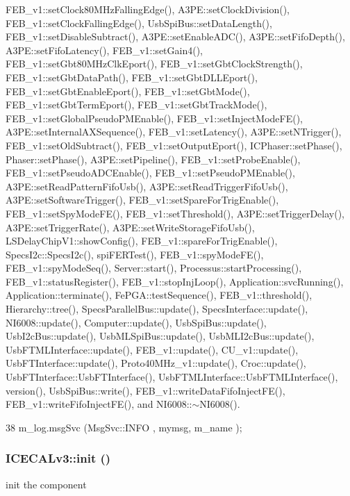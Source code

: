 FEB\_\-v1::setClock80MHzFallingEdge(), A3PE::setClockDivision(), FEB\_\-v1::setClockFallingEdge(), UsbSpiBus::setDataLength(), FEB\_\-v1::setDisableSubtract(), A3PE::setEnableADC(), A3PE::setFifoDepth(), A3PE::setFifoLatency(), FEB\_\-v1::setGain4(), FEB\_\-v1::setGbt80MHzClkEport(), FEB\_\-v1::setGbtClockStrength(), FEB\_\-v1::setGbtDataPath(), FEB\_\-v1::setGbtDLLEport(), FEB\_\-v1::setGbtEnableEport(), FEB\_\-v1::setGbtMode(), FEB\_\-v1::setGbtTermEport(), FEB\_\-v1::setGbtTrackMode(), FEB\_\-v1::setGlobalPseudoPMEnable(), FEB\_\-v1::setInjectModeFE(), A3PE::setInternalAXSequence(), FEB\_\-v1::setLatency(), A3PE::setNTrigger(), FEB\_\-v1::setOldSubtract(), FEB\_\-v1::setOutputEport(), ICPhaser::setPhase(), Phaser::setPhase(), A3PE::setPipeline(), FEB\_\-v1::setProbeEnable(), FEB\_\-v1::setPseudoADCEnable(), FEB\_\-v1::setPseudoPMEnable(), A3PE::setReadPatternFifoUsb(), A3PE::setReadTriggerFifoUsb(), A3PE::setSoftwareTrigger(), FEB\_\-v1::setSpareForTrigEnable(), FEB\_\-v1::setSpyModeFE(), FEB\_\-v1::setThreshold(), A3PE::setTriggerDelay(), A3PE::setTriggerRate(), A3PE::setWriteStorageFifoUsb(), LSDelayChipV1::showConfig(), FEB\_\-v1::spareForTrigEnable(), SpecsI2c::SpecsI2c(), spiFERTest(), FEB\_\-v1::spyModeFE(), FEB\_\-v1::spyModeSeq(), Server::start(), Processus::startProcessing(), FEB\_\-v1::statusRegister(), FEB\_\-v1::stopInjLoop(), Application::svcRunning(), Application::terminate(), FePGA::testSequence(), FEB\_\-v1::threshold(), Hierarchy::tree(), SpecsParallelBus::update(), SpecsInterface::update(), NI6008::update(), Computer::update(), UsbSpiBus::update(), UsbI2cBus::update(), UsbMLSpiBus::update(), UsbMLI2cBus::update(), UsbFTMLInterface::update(), FEB\_\-v1::update(), CU\_\-v1::update(), UsbFTInterface::update(), Proto40MHz\_\-v1::update(), Croc::update(), UsbFTInterface::UsbFTInterface(), UsbFTMLInterface::UsbFTMLInterface(), version(), UsbSpiBus::write(), FEB\_\-v1::writeDataFifoInjectFE(), FEB\_\-v1::writeFifoInjectFE(), and NI6008::$\sim$NI6008().


\begin{DoxyCode}
38 { m_log.msgSvc (MsgSvc::INFO    , mymsg, m_name ); }
\end{DoxyCode}
\hypertarget{classICECALv3_abf7281fad80b80b70c5b13ce66ba3451}{
\subsubsection[{init}]{ ICECALv3::init ()}}
\label{classICECALv3_abf7281fad80b80b70c5b13ce66ba3451}
init the component

